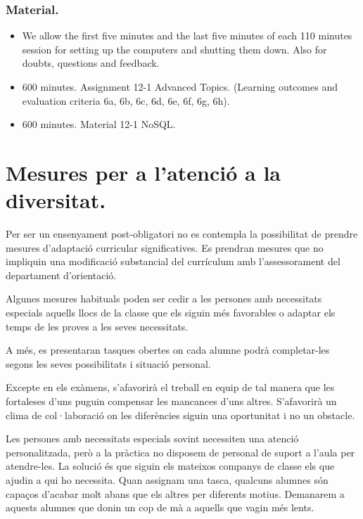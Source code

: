 \documentclass[catalan, a4paper, 12pt, titlepage]{article}
\begin{document}
  \subsubsection{Material.}
  \begin{itemize}
          \item We allow the first five minutes and the last five minutes of each 110 minutes session for setting up the computers and shutting them down. Also for doubts, questions and feedback.
	  \item 600 minutes. Assignment 12-1 Advanced Topics. (\faGraduationCap Learning outcomes and evaluation criteria 6a, 6b, 6c, 6d, 6e, 6f, 6g, 6h).
	  \item 600 minutes. Material 12-1 NoSQL.
  \end{itemize}


\section{Mesures per a l'atenció a la diversitat.}
\label{sec:diversitat}

Per ser un ensenyament post-obligatori no es contempla la possibilitat de prendre mesures d'adaptació curricular significatives. Es prendran mesures que no impliquin una modificació substancial del currículum amb l'assessorament del departament d'orientació.

Algunes mesures habituals poden ser cedir a les persones amb necessitats especials aquells llocs de la classe que els siguin més favorables o adaptar els temps de les proves a les seves necessitats.

A més, es presentaran tasques obertes on cada alumne podrà completar-les segons les seves possibilitats i situació personal.

Excepte en els exàmens, s'afavorirà el treball en equip de tal manera que les fortaleses d'uns puguin compensar les mancances d'uns altres. S'afavorirà un clima de col·laboració on les diferències siguin una oportunitat i no un obstacle.

Les persones amb necessitats especials sovint necessiten una atenció personalitzada, però a la pràctica no disposem de personal de suport a l'aula per atendre-les.
La solució és que siguin els mateixos companys de classe els que ajudin a qui ho necessita.
Quan assignam una tasca, qualcuns alumnes són capaços d'acabar molt abans que els altres per diferents motius.
Demanarem a aquests alumnes que donin un cop de mà a aquells que vagin més lents.
\end{document}
